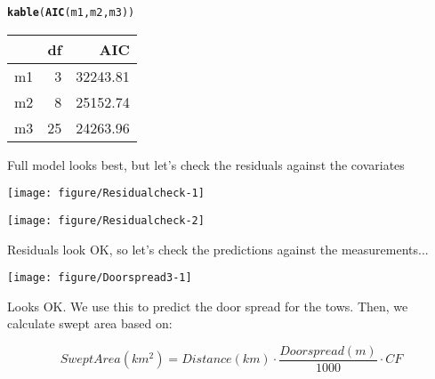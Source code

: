 \documentclass[12pt]{article}\usepackage[]{graphicx}\usepackage[]{color}
\makeatletter
\def\maxwidth{ %
  \ifdim\Gin@nat@width>\linewidth
    \linewidth
  \else
    \Gin@nat@width
  \fi
}
\newcommand{\hlstd}[1]{\textcolor[rgb]{0.345,0.345,0.345}{#1}}%
\newcommand{\hlkwd}[1]{\textcolor[rgb]{0.737,0.353,0.396}{\textbf{#1}}}%
\newenvironment{kframe}{%
 \def\at@end@of@kframe{}%
 \ifinner\ifhmode%
  \def\at@end@of@kframe{\end{minipage}}%
  \begin{minipage}{\columnwidth}%
 \fi\fi%
 \def\FrameCommand##1{\hskip\@totalleftmargin \hskip-\fboxsep
 \colorbox{shadecolor}{##1}\hskip-\fboxsep
     \hskip-\linewidth \hskip-\@totalleftmargin \hskip\columnwidth}%
 \MakeFramed {\advance\hsize-\width
   \@totalleftmargin\z@ \linewidth\hsize
   \@setminipage}}%
 {\par\unskip\endMakeFramed%
 \at@end@of@kframe}
\newenvironment{knitrout}{}{} %
\makeatother
\begin{document}
\begin{kframe}\begin{alltt}
\hlkwd{kable}\hlstd{(}\hlkwd{AIC}\hlstd{(m1, m2, m3))}
\end{alltt}
\end{kframe}
\begin{tabular}{l|r|r}
\hline
  & df & AIC\\
\hline
m1 & 3 & 32243.81\\
\hline
m2 & 8 & 25152.74\\
\hline
m3 & 25 & 24263.96\\
\hline
\end{tabular}



Full model looks best, but let's check the residuals against the covariates
\begin{knitrout}\footnotesize
{}\color{fgcolor}

{\centering \texttt{[image: figure/Residualcheck-1]} 

}




{\centering \texttt{[image: figure/Residualcheck-2]} 

}



\end{knitrout}

Residuals look OK, so let's check the predictions against the measurements...

\begin{knitrout}\footnotesize
{}\color{fgcolor}\begin{kframe}


{\ttfamily\noindent\color{warningcolor}{\#\# Warning: Removed 1138 rows containing missing values (geom\_point).}}\end{kframe}

{\centering \texttt{[image: figure/Doorspread3-1]} 

}



\end{knitrout}

Looks OK.  We use this to predict the door spread for the tows. Then, we calculate
swept area based on:

\begin{equation}
	Swept Area (km^2) = Distance (km) \cdot \frac{Doorspread (m)}{1000}
	\cdot CF 
\end{equation}
\end{document}

